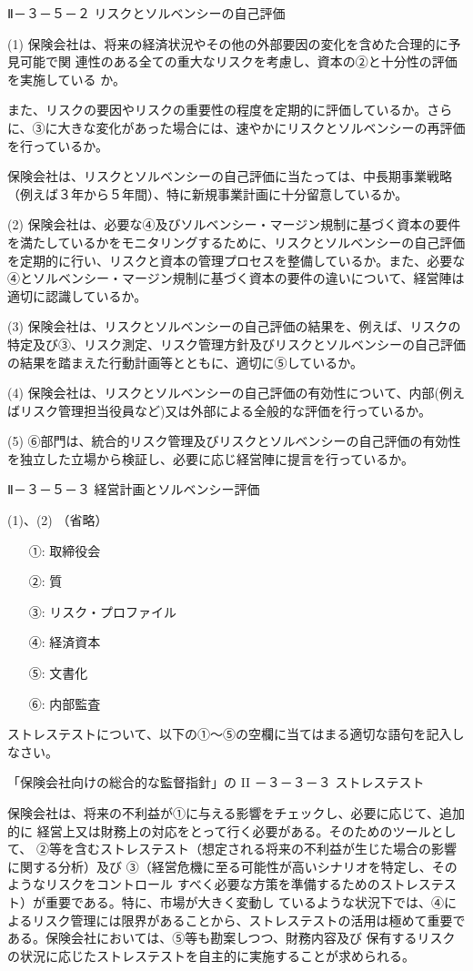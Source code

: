 \documentclass[report,gutter=10mm,fore-edge=10mm,uplatex,dvipdfmx]{jlreq}
\begin{document}
Ⅱ－３－５－２ リスクとソルベンシーの自己評価

(1) 保険会社は、将来の経済状況やその他の外部要因の変化を含めた合理的に予見可能で関
連性のある全ての重大なリスクを考慮し、資本の②と十分性の評価を実施している
か。

また、リスクの要因やリスクの重要性の程度を定期的に評価しているか。さらに、③に大きな変化があった場合には、速やかにリスクとソルベンシーの再評価を行っているか。

保険会社は、リスクとソルベンシーの自己評価に当たっては、中長期事業戦略（例えば３年から５年間）、特に新規事業計画に十分留意しているか。

(2) 保険会社は、必要な④及びソルベンシー・マージン規制に基づく資本の要件を満たしているかをモニタリングするために、リスクとソルベンシーの自己評価を定期的に行い、リスクと資本の管理プロセスを整備しているか。また、必要な④とソルベンシー・マージン規制に基づく資本の要件の違いについて、経営陣は適切に認識しているか。

(3) 保険会社は、リスクとソルベンシーの自己評価の結果を、例えば、リスクの特定及び③、リスク測定、リスク管理方針及びリスクとソルベンシーの自己評価の結果を踏まえた行動計画等とともに、適切に⑤しているか。

(4) 保険会社は、リスクとソルベンシーの自己評価の有効性について、内部(例えばリスク管理担当役員など)又は外部による全般的な評価を行っているか。

(5) ⑥部門は、統合的リスク管理及びリスクとソルベンシーの自己評価の有効性を独立した立場から検証し、必要に応じ経営陣に提言を行っているか。

Ⅱ－３－５－３ 経営計画とソルベンシー評価

(1)、(2) （省略）

\answer{}
\begin{itemize}
\item[ ①: ]  取締役会
\item[ ②: ]  質
\item[ ③: ]  リスク・プロファイル
\item[ ④: ]  経済資本
\item[ ⑤: ]  文書化
\item[ ⑥: ]  内部監査
\end{itemize}

ストレステストについて、以下の①〜⑤の空欄に当てはまる適切な語句を記入しなさい。

「保険会社向けの総合的な監督指針」の II －３－３－３ ストレステスト

保険会社は、将来の不利益が①に与える影響をチェックし、必要に応じて、追加的に
経営上又は財務上の対応をとって行く必要がある。そのためのツールとして、
②等を含むストレステスト（想定される将来の不利益が生じた場合の影響に関する分析）及び
③（経営危機に至る可能性が高いシナリオを特定し、そのようなリスクをコントロール
すべく必要な方策を準備するためのストレステスト）が重要である。特に、市場が大きく変動し
ているような状況下では、④によるリスク管理には限界があることから、ストレステストの活用は極めて重要である。保険会社においては、⑤等も勘案しつつ、財務内容及び
保有するリスクの状況に応じたストレステストを自主的に実施することが求められる。
\end{document}
